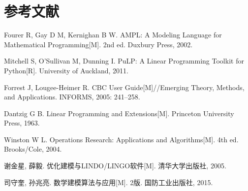 \documentclass[12pt,a4paper]{ctexart}
\begin{document}
\section*{参考文献}

\begin{enumerate}[label={[\arabic*]}]
    \item Fourer R, Gay D M, Kernighan B W. AMPL: A Modeling Language for Mathematical Programming[M]. 2nd ed. Duxbury Press, 2002.
    \item Mitchell S, O'Sullivan M, Dunning I. PuLP: A Linear Programming Toolkit for Python[R]. University of Auckland, 2011.
    \item Forrest J, Lougee-Heimer R. CBC User Guide[M]//Emerging Theory, Methods, and Applications. INFORMS, 2005: 241--258.
    \item Dantzig G B. Linear Programming and Extensions[M]. Princeton University Press, 1963.
    \item Winston W L. Operations Research: Applications and Algorithms[M]. 4th ed. Brooks/Cole, 2004.
    \item 谢金星, 薛毅. 优化建模与LINDO/LINGO软件[M]. 清华大学出版社, 2005.
    \item 司守奎, 孙兆亮. 数学建模算法与应用[M]. 2版. 国防工业出版社, 2015.
\end{enumerate}
\end{document}
